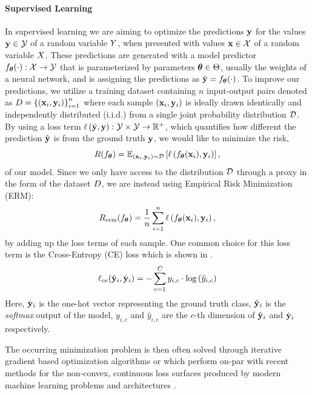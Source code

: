 \paragraph{Supervised Learning}
In supervised learning we are aiming to optimize the predictions $\mathbf{y}$ for the values $\mathbf{y} \in \mathcal{Y}$ of a random variable $Y$, when presented with values $\mathbf{x} \in \mathcal{X}$ of a random variable $X$. These predictions are generated with a model predictor $f_{\boldsymbol{\theta}}(\cdot): \mathcal{X} \rightarrow \mathcal{Y}$ that is parameterized by parameters $\boldsymbol{\theta} \in \Theta$, usually the weights of a neural network,  and is assigning the predictions as $\hat{\mathbf{y}}=f_{\boldsymbol{\theta}}(\cdot)$. To improve our predictions, we utilize a training dataset containing $n$ input-output pairs denoted as $D=\left\{\left(\mathbf{x}_i, \mathbf{y}_i \right)\right\}_{i=1}^{n}$ where each sample $(\mathbf{x}_i, \mathbf{y}_i)$ is ideally drawn identically and independently distributed (i.i.d.) from a single joint probability distribution $\mathcal{D}$. By using a loss term $\ell\left(\hat{\mathbf{y}}, \mathbf{y}\right): \mathcal{Y} \times \mathcal{Y} \rightarrow \mathbb{R}^{+}$, which quantifies how different the prediction $\hat{\mathbf{y}}$ is from the ground truth $\mathbf{y}$, we would like to minimize the risk,
\begin{equation}
    R(f_{\boldsymbol{\theta}}) = \mathbb{E}_{(\mathbf{x}_i, \mathbf{y}_i) \sim \mathcal{D}}\left[\ell\left(f_{\boldsymbol{\theta}}(\mathbf{x}_i), \mathbf{y}_i\right)\right],
\end{equation}
of our model. Since we only have access to the distribution $\mathcal{D}$ through a proxy in the form of the dataset $D$, we are instead using Empirical Risk Minimization (ERM):
\begin{equation}
    R_{\mathrm{erm}}(f_{\boldsymbol{\theta}}) =\frac{1}{n} \sum_{i=1}^n \ell\left(f_{\boldsymbol{\theta}}(\mathbf{x}_i), \mathbf{y}_i\right),
\end{equation}
by adding up the loss terms of each sample. One common choice for this loss term is the Cross-Entropy (CE) loss which is shown in .
\begin{equation}
\label{eq:cross_entropy}
    \ell_{ce}(\hat{\mathbf{y}}_i, \dot{\mathbf{y}}_i)=-\sum_{c=1}^{C} y_{i, c} \cdot \log \left(\hat{y}_{i, c}\right)
\end{equation}
Here, $\dot{\mathbf{y}}_i$ is the one-hot vector representing the ground truth class, $\hat{\mathbf{y}}_i$ is the \emph{softmax} output of the model, $y_{i, c}$ and $\hat{y}_{i, c}$ are the $c$-th dimension of $\hat{\mathbf{y}}_i$ and $\dot{\mathbf{y}}_i$ respectively.

The occurring minimization problem is then often solved through iterative gradient based optimization algorithms \eg \sgd{} \citep{Robbins1951} or \adam \citep{Kingma2015} which perform on-par with recent methods for the non-convex, continuous loss surfaces produced by modern machine learning problems and architectures \citep{schmidt2020descending}.

